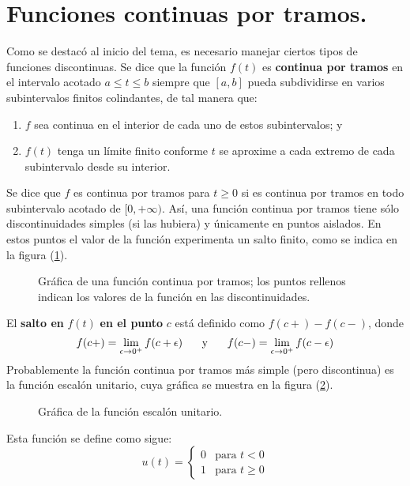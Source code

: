 \section{Funciones continuas por tramos.}
Como se destacó al inicio del tema, es necesario manejar ciertos tipos de funciones discontinuas. Se dice que la función $f(t)$ es \textbf{continua por tramos} en el intervalo acotado $a \leq t \leq b$ siempre que $[a, b]$ pueda subdividirse en varios subintervalos finitos colindantes, de tal manera que:
\begin{enumerate}
\item $f$ sea continua en el interior de cada uno de estos subintervalos; y
\item $f(t)$ tenga un límite finito conforme $t$ se aproxime a cada extremo de cada subintervalo desde su interior.
\end{enumerate}
Se dice que $f$ es continua por tramos para $t \geq 0$ si es continua por tramos en todo subintervalo acotado de $[0, +\infty)$. Así, una función continua por tramos tiene sólo discontinuidades simples (si las hubiera) y únicamente en puntos aislados. En estos puntos el valor de la función experimenta un salto finito, como se indica en la figura (\ref{fig:figura_001}).
\begin{figure}[H]
    \centering
    
    \caption{Gráfica de una función continua por tramos; los puntos rellenos indican los valores de la función en las discontinuidades.}
    \label{fig:figura_001}
\end{figure}
 El \textbf{salto en} $f(t)$ \textbf{en el punto} $c$ está definido como $f(c+) - f(c-)$, donde
\[ f(c+) = \lim_{\epsilon \to 0^{+}} f (c + \epsilon) \hspace{0.5cm} \mbox{ y } \hspace{0.5cm} f(c-) = \lim_{\epsilon \to 0^{+}} f (c - \epsilon) \]
Probablemente la función continua por tramos más simple (pero discontinua) es la función escalón unitario, cuya gráfica se muestra en la figura (\ref{fig:figura_002}).
\begin{figure}[H]
\centering

\caption{Gráfica de la función escalón unitario.}
\label{fig:figura_002}
\end{figure}
Esta función se define como sigue:
\begin{equation}
u(t) = \begin{cases}
0 & \mbox{para } t < 0 \\
1 & \mbox{para } t \geq 0
\end{cases}
\label{eq:019}
\end{equation}
